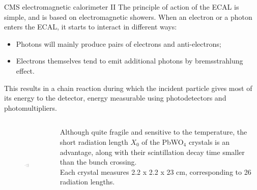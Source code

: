 \documentclass[8pt]{beamer}
\begin{document}
\begin{frame}{CMS electromagnetic calorimeter II}
\justifying
\vspace{10pt}
The principle of action of the ECAL is simple, and is based on \alert{electromagnetic showers}. When an electron or a photon enters the ECAL, it starts to interact in different ways:
\begin{itemize}
\item Photons will mainly produce pairs of electrons and anti-electrons;
\item Electrons themselves tend to emit additional photons by bremsstrahlung effect.
\end{itemize}
This results in a chain reaction during which the incident particle gives most of its energy to the detector, energy measurable using photodetectors and photomultipliers. \vfill

\begin{columns}
	\begin{column}{0.45 \textwidth}
\begin{figure}[htbp]
\begin{center}
\includegraphics[width=5.2cm, height=4cm]{figs/EMShowers.png}
\end{center}
\end{figure}
\end{column}
	\begin{column}{0.52 \textwidth}
	\justifying
	Although quite fragile and sensitive to the temperature, the short radiation length $X_0$ of the PbWO$_4$ crystals is an advantage, along with their scintillation decay time smaller than the bunch crossing.  \\ \vspace{10pt}
	Each crystal measures 2.2 x 2.2 x 23 cm, corresponding to 26 radiation lengths.
	\end{column}
	\end{columns} \vfill
\end{frame}
\end{document}
